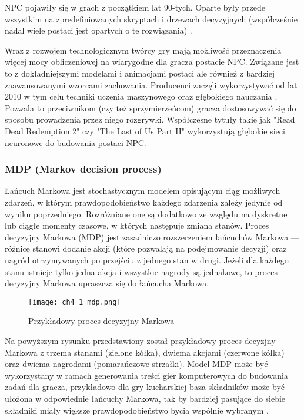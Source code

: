 NPC pojawiły się w grach z początkiem lat 90-tych. Oparte były przede wszystkim na zpredefiniowanych
skryptach i drzewach decyzyjnych\cite{storytelling_through} (współcześnie nadal wiele postaci jest
opartych o te rozwiązania) \cite{from_pong_to_narrative}.

Wraz z rozwojem technologicznym twórcy gry mają możliwość przeznaczenia więcej mocy obliczeniowej
na wiarygodne dla gracza postacie NPC. Związane jest to z dokładniejszymi modelami i animacjami
postaci ale również z bardziej zaawansowanymi wzorcami zachowania. Producenci zaczęli wykorzystywać
od lat 2010 w tym celu techniki uczenia maszynowego oraz głębokiego nauczania
\cite{from_pong_to_narrative}. Pozwala to przeciwnikom (czy też sprzymierzeńcom) gracza
dostosowywać się do sposobu prowadzenia przez niego rozgrywki. Współczesne tytuły takie jak
"Read Dead Redemption 2" czy "The Last of Us Part II" wykorzystują głębokie sieci neuronowe do
budowania postaci NPC\cite{from_pong_to_narrative}.

\subsubsection*{MDP (Markov decision process)}

Łańcuch Markowa jest stochastycznym modelem opisującym ciąg możliwych zdarzeń, w którym
prawdopodobieństwo każdego zdarzenia zależy jedynie od wyniku poprzedniego. Rozróżniane one
są dodatkowo ze względu na dyskretne lub ciągłe momenty czasowe, w których następuje zmiana
stanów. Proces decyzyjny Markowa (MDP) jest zasadniczo rozszerzeniem łańcuchów Markowa ---
różnicę stanowi dodanie akcji (które pozwalają na podejmowanie decyzji) oraz nagród otrzymywanych
po przejściu z jednego stan w drugi. Jeżeli dla każdego stanu istnieje tylko jedna akcja i
wszystkie nagrody są jednakowe, to proces decyzyjny Markowa upraszcza się do łańcucha Markowa.

\begin{figure}[h]
    \centering
    \texttt{[image: ch4\_1\_mdp.png]}
    \caption{Przykładowy proces decyzyjny Markowa}
    \label{fig:ch4_1_mdp}
\end{figure}

Na powyższym rysunku przedstawiony został przykładowy proces decyzjny Markowa z trzema stanami (zielone
kółka), dwiema akcjami (czerwone kółka) oraz dwiema nagrodami (pomarańczowe strzałki). Model MDP może
być wykorzystany w ramach generowania treści gier komputerowych do budowania zadań dla gracza,
przykładowo dla gry kucharskiej baza składników może być ułożona w odpowiednie łańcuchy Markowa, tak
by bardziej pasujące do siebie składniki miały większe prawdopodobieństwo bycia wspólnie wybranym
\cite{ammanabrolu2020automated}.

